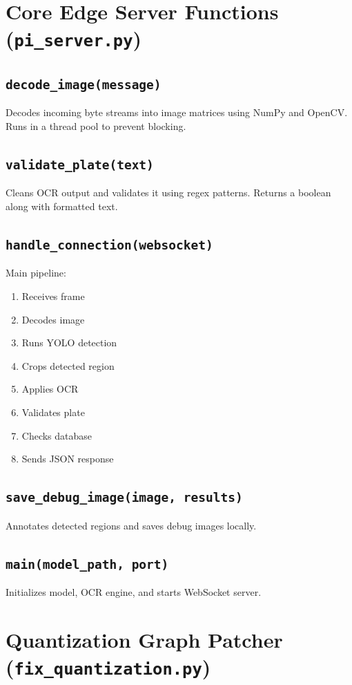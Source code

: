\documentclass[11pt]{report}
\begin{document}
\section{Core Edge Server Functions (\texttt{pi\_server.py})}

\subsection{\texttt{decode\_image(message)}}
Decodes incoming byte streams into image matrices using NumPy and OpenCV. Runs in a thread pool to prevent blocking.

\subsection{\texttt{validate\_plate(text)}}
Cleans OCR output and validates it using regex patterns. Returns a boolean along with formatted text.

\subsection{\texttt{handle\_connection(websocket)}}
Main pipeline:
\begin{enumerate}
    \item Receives frame
    \item Decodes image
    \item Runs YOLO detection
    \item Crops detected region
    \item Applies OCR
    \item Validates plate
    \item Checks database
    \item Sends JSON response
\end{enumerate}

\subsection{\texttt{save\_debug\_image(image, results)}}
Annotates detected regions and saves debug images locally.

\subsection{\texttt{main(model\_path, port)}}
Initializes model, OCR engine, and starts WebSocket server.

\section{Quantization Graph Patcher (\texttt{fix\_quantization.py})}
\end{document}
